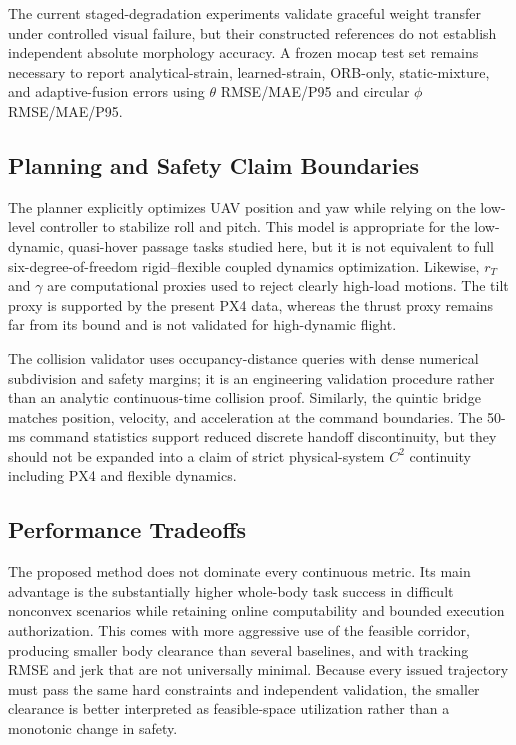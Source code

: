 \documentclass[journal,twoside]{IEEEtran}
\begin{document}
The current staged-degradation experiments validate graceful weight transfer under controlled visual failure, but their constructed references do not establish independent absolute morphology accuracy. A frozen mocap test set remains necessary to report analytical-strain, learned-strain, ORB-only, static-mixture, and adaptive-fusion errors using $\theta$ RMSE/MAE/P95 and circular $\phi$ RMSE/MAE/P95.

\subsection{Planning and Safety Claim Boundaries}
The planner explicitly optimizes UAV position and yaw while relying on the low-level controller to stabilize roll and pitch. This model is appropriate for the low-dynamic, quasi-hover passage tasks studied here, but it is not equivalent to full six-degree-of-freedom rigid--flexible coupled dynamics optimization. Likewise, $r_T$ and $\gamma$ are computational proxies used to reject clearly high-load motions. The tilt proxy is supported by the present PX4 data, whereas the thrust proxy remains far from its bound and is not validated for high-dynamic flight.

The collision validator uses occupancy-distance queries with dense numerical subdivision and safety margins; it is an engineering validation procedure rather than an analytic continuous-time collision proof. Similarly, the quintic bridge matches position, velocity, and acceleration at the command boundaries. The 50-ms command statistics support reduced discrete handoff discontinuity, but they should not be expanded into a claim of strict physical-system $C^2$ continuity including PX4 and flexible dynamics.

\subsection{Performance Tradeoffs}
The proposed method does not dominate every continuous metric. Its main advantage is the substantially higher whole-body task success in difficult nonconvex scenarios while retaining online computability and bounded execution authorization. This comes with more aggressive use of the feasible corridor, producing smaller body clearance than several baselines, and with tracking RMSE and jerk that are not universally minimal. Because every issued trajectory must pass the same hard constraints and independent validation, the smaller clearance is better interpreted as feasible-space utilization rather than a monotonic change in safety.
\end{document}
